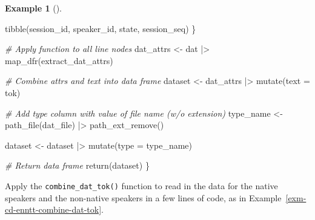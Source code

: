 \documentclass[
  letterpaper,
]{latex/krantz}
\newenvironment{Shaded}{\begin{snugshade}}{\end{snugshade}}
\newcommand{\AttributeTok}[1]{\textcolor[rgb]{0.00,0.00,0.00}{#1}}
\newcommand{\CommentTok}[1]{\textcolor[rgb]{0.00,0.00,0.00}{\textit{#1}}}
\newcommand{\FunctionTok}[1]{\textcolor[rgb]{0.00,0.00,0.00}{#1}}
\newcommand{\NormalTok}[1]{\textcolor[rgb]{0.00,0.00,0.00}{#1}}
\newcommand{\OtherTok}[1]{\textcolor[rgb]{0.00,0.00,0.00}{#1}}
\newcommand{\SpecialCharTok}[1]{\textcolor[rgb]{0.00,0.00,0.00}{#1}}
\theoremstyle{definition}
\newtheorem{example}{Example}[chapter]
\theoremstyle{remark}
\begin{document}
\begin{example}[]
\begin{Shaded}
\begin{Highlighting}[]
    \FunctionTok{tibble}\NormalTok{(session\_id, speaker\_id, state, session\_seq)}
\NormalTok{  \}}

  \CommentTok{\# Apply function to all line nodes}
\NormalTok{  dat\_attrs }\OtherTok{\textless{}{-}}
\NormalTok{    dat }\SpecialCharTok{|\textgreater{}}
    \FunctionTok{map\_dfr}\NormalTok{(extract\_dat\_attrs)}

  \CommentTok{\# Combine attrs and text into data frame}
\NormalTok{  dataset }\OtherTok{\textless{}{-}}
\NormalTok{    dat\_attrs }\SpecialCharTok{|\textgreater{}}
    \FunctionTok{mutate}\NormalTok{(}\AttributeTok{text =}\NormalTok{ tok)}

  \CommentTok{\# Add type column with value of file name (w/o extension)}
\NormalTok{  type\_name }\OtherTok{\textless{}{-}} \FunctionTok{path\_file}\NormalTok{(dat\_file) }\SpecialCharTok{|\textgreater{}} \FunctionTok{path\_ext\_remove}\NormalTok{()}

\NormalTok{  dataset }\OtherTok{\textless{}{-}}
\NormalTok{    dataset }\SpecialCharTok{|\textgreater{}}
    \FunctionTok{mutate}\NormalTok{(}\AttributeTok{type =}\NormalTok{ type\_name)}

  \CommentTok{\# Return data frame}
  \FunctionTok{return}\NormalTok{(dataset)}
\NormalTok{\}}
\end{Highlighting}
\end{Shaded}

\end{example}

Apply the \texttt{combine\_dat\_tok()} function to read in the data for
the native speakers and the non-native speakers in a few lines of code,
as in Example~\ref{exm-cd-enntt-combine-dat-tok}.
\end{document}
